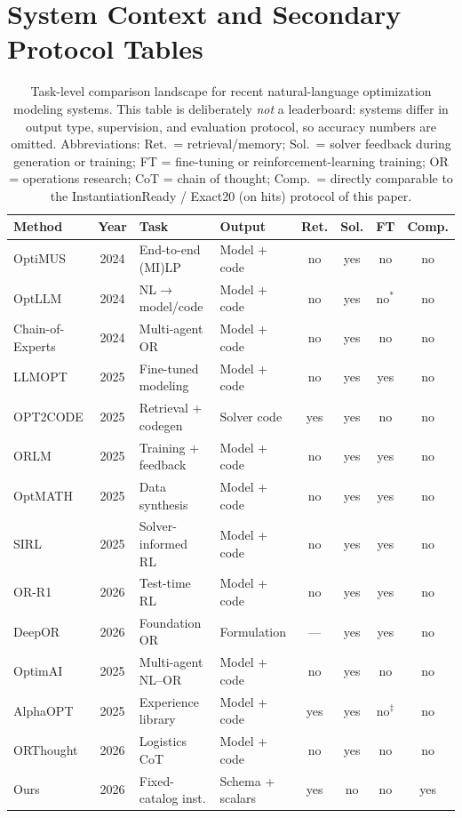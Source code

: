 \documentclass[pdflatex,sn-basic,Numbered]{sn-jnl}
\renewcommand{\arraystretch}{1.18}
\begin{document}
\section{System Context and Secondary Protocol Tables}
\begin{table}[htbp]
\centering
\caption{Task-level comparison landscape for recent natural-language optimization modeling systems.
This table is deliberately \emph{not} a leaderboard: systems differ in output type, supervision, and
evaluation protocol, so accuracy numbers are omitted. Abbreviations: Ret.\ = retrieval/memory;
Sol.\ = solver feedback during generation or training; FT = fine-tuning or reinforcement-learning training; OR = operations research; CoT = chain of thought;
Comp.\ = directly comparable
to the InstantiationReady / Exact20 (on hits) protocol of this paper.}
\label{tab:comparison_landscape}
\small
\setlength{\tabcolsep}{2.4pt}
\renewcommand{\arraystretch}{1.12}
\begin{tabularx}{\linewidth}{@{}>{\raggedright\arraybackslash}p{2.6cm}c>{\raggedright\arraybackslash}p{2.6cm}Xcccc@{}}
\toprule
Method & Year & Task & Output & Ret. & Sol. & FT & Comp. \\
\midrule
OptiMUS & 2024 & End-to-end (MI)LP & Model + code & no & yes & no & no \\
OptLLM & 2024 & NL$\rightarrow$model/code & Model + code & no & yes & no$^{*}$ & no \\
Chain-of-Experts & 2024 & Multi-agent OR & Model + code & no & yes & no & no \\
LLMOPT & 2025 & Fine-tuned modeling & Model + code & no & yes & yes & no \\
OPT2CODE & 2025 & Retrieval + codegen & Solver code & yes & yes & no & no \\
ORLM & 2025 & Training + feedback & Model + code & no & yes & yes & no \\
OptMATH & 2025 & Data synthesis & Model + code & no & yes & yes & no \\
SIRL & 2025 & Solver-informed RL & Model + code & no & yes & yes & no \\
OR-R1 & 2026 & Test-time RL & Model + code & no & yes & yes & no \\
DeepOR & 2026 & Foundation OR & Formulation & --- & yes & yes & no \\
OptimAI & 2025 & Multi-agent NL--OR & Model + code & no & yes & no & no \\
AlphaOPT & 2025 & Experience library & Model + code & yes & yes & no$^{\ddagger}$ & no \\
ORThought & 2026 & Logistics CoT & Model + code & no & yes & no & no \\
Ours & 2026 & Fixed-catalog inst. & Schema + scalars & yes & no & no & yes \\
\bottomrule
\end{tabularx}


\end{table}
\end{document}

